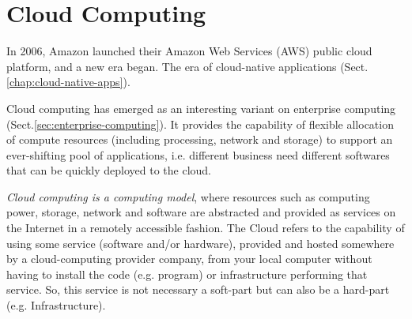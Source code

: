 \chapter{Cloud Computing}
\label{chap:cloud_computing}


In 2006, Amazon launched their Amazon Web Services (AWS) public cloud platform,
and a new era began. The era of cloud-native applications (Sect.\ref{chap:cloud-native-apps}).

Cloud computing has emerged as an interesting variant on enterprise computing
(Sect.\ref{sec:enterprise-computing}).
It provides the capability of flexible allocation of compute resources
(including processing, network and storage) to support an ever-shifting pool of
applications, i.e. different business need different softwares that can be
quickly deployed to the cloud.

{\it Cloud computing is a computing model}, where resources such as computing
power, storage, network and software are abstracted and provided as services on
the Internet in a remotely accessible fashion.
The Cloud refers to the capability of using some service (software and/or
hardware), provided and hosted somewhere by a cloud-computing provider company,
from your local computer without having to install the code (e.g. program) or
infrastructure performing that service. So, this service is not necessary a
soft-part but can also be a hard-part (e.g. Infrastructure).

